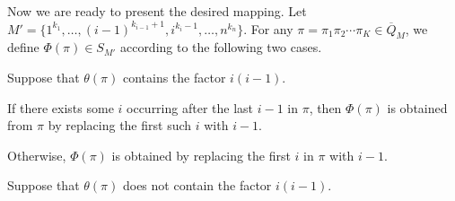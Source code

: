 \documentclass[11pt]{article}
\numberwithin{equation}{section}
\def\oQ{\overline{Q}}
\begin{document}
Now we are ready to present the desired mapping. Let $M'=\{1^{k_1},\ldots,(i-1)^{k_{i-1}+1},i^{k_{i}-1},\ldots,n^{k_n}\}$. For any $\pi=\pi_1\pi_2\cdots\pi_K\in\oQ_M$, we define $\Phi(\pi)\in S_{M'}$ according to the following two cases. 

 Suppose that $\theta(\pi)$ contains the factor $i(i-1)$.

 If there exists some $i$ occurring after the last $i-1$ in $\pi$, then $\Phi(\pi)$ is obtained from $\pi$ by replacing the first such $i$ with $i-1$.

 Otherwise, $\Phi(\pi)$ is obtained by replacing the first $i$ in $\pi$ with $i-1$.

 Suppose that $\theta(\pi)$ does not contain the factor $i(i-1)$. %
\end{document}
